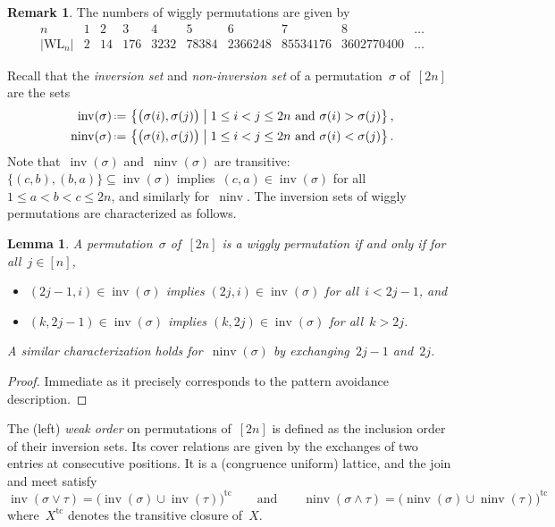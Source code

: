 \documentclass{amsart}
\newtheorem{lemma}[theorem]{Lemma}
\theoremstyle{definition}
\newtheorem{remark}[theorem]{Remark}
\newcommand{\set}[2]{\left\{ #1 \;\middle|\; #2 \right\}} %
\newcommand{\eqdef}{\mbox{\,\raisebox{0.2ex}{\scriptsize\ensuremath{\mathrm:}}\ensuremath{=}\,}} %
\DeclareMathOperator{\inv}{inv} %
\DeclareMathOperator{\ninv}{ninv} %
\newcommand{\darkblue}{\color{darkblue}} %
\newcommand{\defn}[1]{\textsl{\darkblue #1}} %
\newcommand{\meet}{\wedge} %
\newcommand{\join}{\vee} %
\newcommand{\wigglyLattice}{\mathrm{WL}} %
\begin{document}
\begin{remark}
The numbers of wiggly permutations are given by
\[
\begin{array}{c|ccccccccc}
n & 1 & 2 & 3 & 4 & 5 & 6 & 7 & 8 & \dots \\
\hline
|\wigglyLattice_n| & 2 & 14 & 176 & 3232 & 78384 & 2366248 & 85534176 & 3602770400 & \dots
\end{array}
\]
\end{remark}

Recall that the \defn{inversion set} and \defn{non-inversion set} of a permutation~$\sigma$ of~$[2n]$ are the sets
\begin{align*}
\inv(\sigma) & \eqdef \set{\big( \sigma(i), \sigma(j) \big)}{1 \le i < j \le 2n \text{ and } \sigma(i) > \sigma(j)}, \\
\ninv(\sigma) & \eqdef \set{\big( \sigma(i), \sigma(j) \big)}{1 \le i < j \le 2n \text{ and } \sigma(i) < \sigma(j)}.
\end{align*}
Note that~$\inv(\sigma)$ and~$\ninv(\sigma)$ are transitive: $\{(c,b), (b,a)\} \subseteq \inv(\sigma)$ implies~$(c,a) \in \inv(\sigma)$ for all~${1 \le a < b < c \le 2n}$, and similarly for~$\ninv$.
The inversion sets of wiggly permutations are characterized as follows.

\begin{lemma}
\label{lem:inversionSetsWigglyPermutations}
A permutation~$\sigma$ of~$[2n]$ is a wiggly permutation if and only if for all~$j \in [n]$,
\begin{itemize}
\item $(2j-1, i) \in \inv(\sigma)$ implies $(2j, i) \in \inv(\sigma)$ for all~$i < 2j-1$, and
\item $(k, 2j-1) \in \inv(\sigma)$ implies $(k, 2j) \in \inv(\sigma)$ for all~$k > 2j$.
\end{itemize}
A similar characterization holds for~$\ninv(\sigma)$ by exchanging~$2j-1$ and~$2j$.
\end{lemma}

\begin{proof}
Immediate as it precisely corresponds to the pattern avoidance description.
\end{proof}

The (left) \defn{weak order} on permutations of~$[2n]$ is defined as the inclusion order of their inversion sets.
Its cover relations are given by the exchanges of two entries at consecutive positions.
It is a (congruence uniform) lattice, and the join and meet satisfy
\[
\inv(\sigma \join \tau) = \big( \inv(\sigma) \cup \inv(\tau) \big)^\textrm{tc}
\qquad\text{and}\qquad
\ninv(\sigma \meet \tau) = \big( \ninv(\sigma) \cup \ninv(\tau) \big)^\textrm{tc}
\]
where~$X^\mathrm{tc}$ denotes the transitive closure of~$X$.
\end{document}
